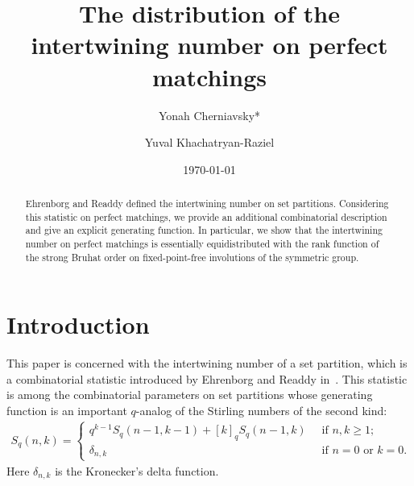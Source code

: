 \documentclass[11pt]{amsart}
\numberwithin{figure}{section}
\theoremstyle{plain}
\theoremstyle{definition}
\begin{document}
\title{The distribution of the intertwining number on perfect matchings}
	
	
\author{Yonah Cherniavsky*}
\author{Yuval Khachatryan-Raziel}
	
\address[A1,A2]{Department of Mathematics, Ariel University, Israel}
	
\normalsize
	
	
\date{\today} 
\maketitle
\begin{abstract}
Ehrenborg and Readdy defined the intertwining number on set partitions. Considering this statistic on perfect matchings, we provide an additional combinatorial description and give an explicit generating function. In particular, we show that the intertwining number on perfect matchings is essentially equidistributed with the rank function of the strong Bruhat order on fixed-point-free involutions of the symmetric group.

\end{abstract}

\section{Introduction}

This paper is concerned with the intertwining number of a set partition, which is a combinatorial statistic introduced by Ehrenborg and Readdy in~\cite{EhrenborgReaddy}. This statistic is among the combinatorial parameters on set partitions whose generating function is an important $q$-analog of the Stirling numbers of the second kind: 
\begin{align}\label{A:particular}
S_q(n,k)=
\begin{cases}
q^{k-1}S_q(n-1,k-1)+[k]_qS_q(n-1,k) & \ \text{ if $n,k\geq 1$};\\
\delta_{n,k} & \ \text{ if $n=0$ or $k=0$.}
\end{cases}
\end{align}
Here $\delta_{n,k}$ is the Kronecker's delta function.
\end{document}
